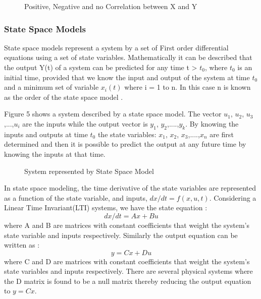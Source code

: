 \documentclass[article,type=msc,colorback,12pt,accentcolor=tud7b]{tudthesis}
\begin{document}
 \begin{figure}
 \begin{center}
  \makebox[\textwidth]{\texttt{[image: B7]}}
\end{center}
\caption{Positive, Negative and no Correlation between X and Y \cite{correlation}}
\end{figure}

\subsubsection{State Space Models}

State space models represent a system by a set of First order differential equations using a set of state variables. Mathematically it can be described that the output Y(t) of a system can be predicted for any time t > $t_0$,  where $t_0$ is an initial time, provided that we know the input and output of the system at time $t_0$ and a minimum set of variable $x_i(t)$ where i = 1 to n. In this case n is known as the order of the state space model \cite{rowell2002state}. 

Figure 5 shows a system described by a state space model. The vector $u_1$, $u_2$, $u_3$,...,$u_i$ are the inputs while the output vector is $y_1$, $y_2$,....,$y_k$. By knowing the inputs and outputs at time $t_0$ the state variables: $x_1$, $x_2$, $x_3$,....,$x_n$ are first determined and then it is possible to predict the output at any future time by knowing the inputs at that time.

 \begin{figure}
 \begin{center}
  \makebox[\textwidth]{\texttt{[image: B6]}}
\end{center}
\caption{System represented by State Space Model}
\end{figure}

In state space modeling, the time derivative of the state variables are represented as a function of the state variable, and inputs, $dx/dt = f(x,u,t)$. Considering a Linear Time Invariant(LTI) systems, we have the state equation \cite{rowell2002state}: $$ dx/dt = Ax + Bu $$ where A and B are matrices with constant coefficients that weight the system's state variable and inputs respectively. Similarly the output equation can be written as \cite{rowell2002state}: $$ y = Cx + Du $$ where C and D are matrices with constant coefficients that weight the system's state variables and inputs respectively. There are several physical systems where the D matrix is found to be a null matrix thereby reducing the output equation to $ y = Cx $.
\end{document}
